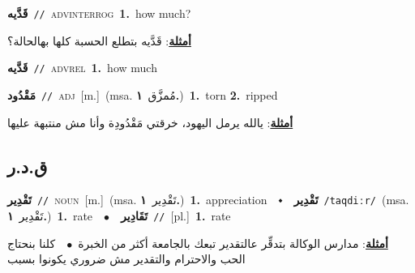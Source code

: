 \documentclass[10pt,a4paper,twoside]{article} %
\begin{document}
\begin{multicols}{2}
{\setlength\topsep{0pt}\textbf{\foreignlanguage{arabic}{قَدَّيه}}\ {\color{gray}\texttt{//}\color{black}}\ \textsc{adv\textunderscore interrog}\ \textbf{1.}~how much?\  \begin{flushright}\color{gray}\foreignlanguage{arabic}{\textbf{\underline{\foreignlanguage{arabic}{أمثلة}}}: قَدَّيه بتطلع الحسبة كلها بهالحالة؟}\end{flushright}\color{black}} \vspace{2mm}

{\setlength\topsep{0pt}\textbf{\foreignlanguage{arabic}{قَدَّيه}}\ {\color{gray}\texttt{//}\color{black}}\ \textsc{adv\textunderscore rel}\ \textbf{1.}~how much\ } \vspace{2mm}

{\setlength\topsep{0pt}\textbf{\foreignlanguage{arabic}{مَقْدُود}}\ {\color{gray}\texttt{//}\color{black}}\ \textsc{adj}\ [m.]\ \color{gray}(msa. \foreignlanguage{arabic}{مُمزَّق}~\foreignlanguage{arabic}{\textbf{١.}})\color{black}\ \textbf{1.}~torn  \textbf{2.}~ripped\  \begin{flushright}\color{gray}\foreignlanguage{arabic}{\textbf{\underline{\foreignlanguage{arabic}{أمثلة}}}: يالله يرمل اليهود، خرقتي مَقْدُودِة وأنا مش منتبهة عليها}\end{flushright}\color{black}} \vspace{2mm}

\vspace{-3mm}
\subsection*{\color{blue}\foreignlanguage{arabic}{ق.د.ر}\color{blue}{}} 

{\setlength\topsep{0pt}\textbf{\foreignlanguage{arabic}{تَقْدِير}}\ {\color{gray}\texttt{//}\color{black}}\ \textsc{noun}\ [m.]\ \color{gray}(msa. \foreignlanguage{arabic}{تَقْدِير}~\foreignlanguage{arabic}{\textbf{١.}})\color{black}\ \textbf{1.}~appreciation\ \ $\smblkdiamond$\ \ \setlength\topsep{0pt}\textbf{\foreignlanguage{arabic}{تَقْدِير}}\ {\color{gray}\texttt{/taqdiːr/}\color{black}}\ \color{gray}(msa. \foreignlanguage{arabic}{تَقْدِير}~\foreignlanguage{arabic}{\textbf{١.}})\color{black}\ \textbf{1.}~rate\ \ $\bullet$\ \ \setlength\topsep{0pt}\textbf{\foreignlanguage{arabic}{تَقَادِير}}\ {\color{gray}\texttt{//}\color{black}}\ [pl.]\ \textbf{1.}~rate\  \begin{flushright}\color{gray}\foreignlanguage{arabic}{\textbf{\underline{\foreignlanguage{arabic}{أمثلة}}}: مدارس الوكالة بتدقِّر عالتقدير تبعك بالجامعة أكثر من الخبرة\ $\bullet$\ \  كلنا بنحتاج الحب والاحترام والتقدير مش ضروري يكونوا بسبب}\end{flushright}\color{black}} \vspace{2mm}


\end{multicols}
\end{document}
